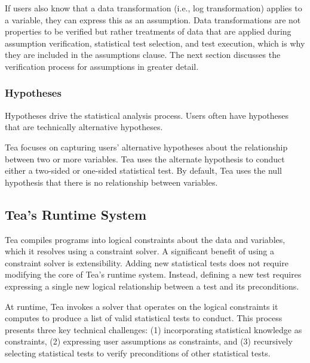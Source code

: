If users also know that a data transformation (i.e., log transformation) applies
to a variable, they can express this as an assumption. Data transformations are
not properties to be verified but rather treatments of data that are applied
during assumption verification, statistical test selection, and test execution,
which is why they are included in the assumptions clause. The next section discusses the
verification process for assumptions in greater detail.


\vspace{-7pt}
\subsubsection{Hypotheses}
Hypotheses drive the statistical analysis process. Users often have
hypotheses that are technically alternative hypotheses.

Tea focuses on capturing users' alternative hypotheses about the
relationship between two or more variables. Tea uses the alternate
hypothesis to conduct either a two-sided or one-sided statistical
test. By default, Tea uses the null hypothesis that there is no
relationship between variables.



\subsection{Tea's Runtime System} \label{sec:TeaRS}
Tea compiles programs into logical constraints about the data and
variables, which it resolves using a constraint solver. A significant
benefit of using a constraint solver is extensibility. Adding new
statistical tests does not require modifying the core of Tea's runtime
system. Instead, defining a new test requires expressing a single new
logical relationship between a test and its preconditions.

At runtime, Tea invokes a solver that operates on the logical
constraints it computes to produce a list of valid statistical tests
to conduct. This process presents three key technical challenges: (1)
incorporating statistical knowledge as constraints, (2) expressing
user assumptions as constraints, and (3) recursively selecting
statistical tests to verify preconditions of other statistical tests.

\vspace{-3pt}
